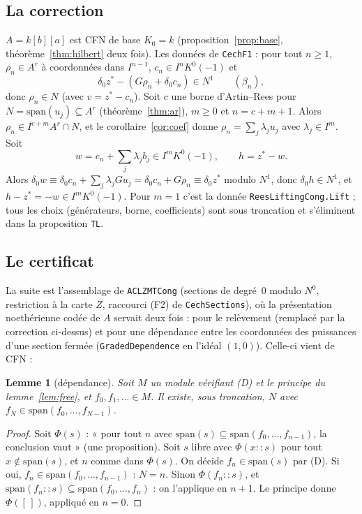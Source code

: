 \documentclass[11pt]{amsart}
\newtheorem{lemma}[theorem]{Lemme}
\theoremstyle{definition}
\theoremstyle{remark}
\newcommand{\sm}{\mathrm{span}}
\begin{document}
\subsection{La correction}
$A=k[b][a]$ est CFN de base $K_0=k$ (proposition~\ref{prop:base},
théorème~\ref{thm:hilbert} deux fois). Les données de \texttt{CechF1} :
pour tout $n\ge1$, $\rho_n\in A^r$ à coordonnées dans $I^{n-1}$,
$c_n\in I^nK^0(-1)$ et
\[\delta_0z^*-(G\rho_n+\delta_0c_n)\in N^1\qquad(\beta_n),\]
donc $\rho_n\in N$ (avec $v=z^*-c_n$). Soit $c$ une borne d'Artin--Rees
pour $N=\sm(u_j)\subseteq A^r$ (théorème~\ref{thm:ar}), $m\ge0$ et
$n=c+m+1$. Alors $\rho_n\in I^{c+m}A^r\cap N$, et le
corollaire~\ref{cor:coef} donne $\rho_n=\sum_j\lambda_ju_j$ avec
$\lambda_j\in I^m$. Soit
\[w=c_n+\sum_j\lambda_jb_j\in I^mK^0(-1),\qquad h=z^*-w .\]
Alors $\delta_0w\equiv\delta_0c_n+\sum_j\lambda_jGu_j=\delta_0c_n+G\rho_n
\equiv\delta_0z^*$ modulo $N^1$, donc $\delta_0h\in N^1$, et
$h-z^*=-w\in I^mK^0(-1)$. Pour $m=1$ c'est la donnée
\texttt{ReesLiftingCong.Lift} ; tous les choix (générateurs, borne,
coefficients) sont sous troncation et s'éliminent dans la proposition
\texttt{TL}.

\subsection{Le certificat}
La suite est l'assemblage de \texttt{ACLZMTCong} (sections de degré~$0$
modulo $N^0$, restriction à la carte $Z$, raccourci (F2) de
\texttt{CechSections}), où la présentation noethérienne codée de $A$ servait
deux fois : pour le relèvement (remplacé par la correction ci-dessus) et
pour une dépendance entre les coordonnées des puissances d'une section
fermée (\texttt{GradedDependence} en l'idéal $(1,0)$). Celle-ci vient de
CFN :

\begin{lemma}[dépendance]\label{lem:dep}
Soit $M$ un module vérifiant (D) et le principe du
lemme~\ref{lem:free}, et $f_0,f_1,\dots\in M$. Il existe, sous troncation,
$N$ avec $f_N\in\sm(f_0,\dots,f_{N-1})$.
\end{lemma}

\begin{proof}
Soit $\Phi(s)$ : « pour tout $n$ avec $\sm(s)\subseteq\sm(f_0,\dots,f_{n-1})$,
la conclusion vaut » (une proposition). Soit $s$ libre avec $\Phi(x::s)$
pour tout $x\notin\sm(s)$, et $n$ comme dans $\Phi(s)$. On décide
$f_n\in\sm(s)$ par (D). Si oui, $f_n\in\sm(f_0,\dots,f_{n-1})$ : $N=n$.
Sinon $\Phi(f_n::s)$, et $\sm(f_n::s)\subseteq\sm(f_0,\dots,f_n)$ : on
l'applique en $n+1$. Le principe donne $\Phi([\,])$, appliqué en $n=0$.
\end{proof}
\end{document}
